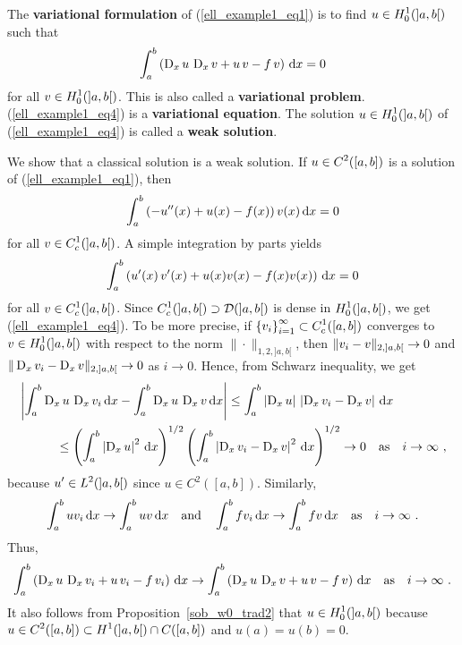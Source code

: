 \begin{egg}
The {\bfseries variational formulation} of
(\ref{ell_example1_eq1}) is to find $\displaystyle u \in H^1_0(]a,b[)$ such that
\begin{equation} \label{ell_example1_eq4}
\int_a^b \left( \operatorname{D}_x u\,\operatorname{D}_x v + u\, v -f\, v \right) \,\mathrm{d}{x} = 0
\end{equation}
for all $\displaystyle v \in H^{1}_0(]a,b[)$.
This is also called a {\bfseries variational problem}.
(\ref{ell_example1_eq4}) is a {\bfseries variational equation}.  The
solution $\displaystyle u \in H^1_0(]a,b[)$ of
(\ref{ell_example1_eq4}) is called a {\bfseries weak solution}.

We show that a classical solution is a weak solution.  If
$\displaystyle u \in C^2([a,b])$ is a solution of (\ref{ell_example1_eq1}), then
\[
\int_a^b \left( - u''(x) + u(x) - f(x) \right)v(x)\,\mathrm{d}{x} = 0
\]
for all $\displaystyle v \in C^1_c(]a,b[)$.
A simple integration by parts yields
\[
\int_a^b \left( u'(x)\, v'(x)+ u(x) v(x) -
f(x)v(x)\right) \,\mathrm{d}{x} = 0
\]
for all $\displaystyle v \in C^1_c(]a,b[)$.
Since $\displaystyle C^1_c(]a,b[)\supset \mathcal{D}(]a,b[)$ is dense in
$\displaystyle H^1_0(]a,b[)$, we get (\ref{ell_example1_eq4}).  To be
more precise, if
$\displaystyle \left\{v_i\right\}_{i=1}^\infty \subset C^1_c([a,b])$
converges to $\displaystyle v \in H^1_0(]a,b[)$ with respect to the norm
$\|\cdot\|_{1,2,]a,b[}$, then
$\displaystyle \|v_i - v\|_{2,]a,b[} \to 0$ and
$\displaystyle \|\operatorname{D}_x v_i - \operatorname{D}_x v\|_{2,]a,b[} \to 0$ as $i \to 0$.
Hence, from Schwarz inequality, we get
\begin{align*}
&\left|\int_a^b \operatorname{D}_x u \, \operatorname{D}_x v_i \,\mathrm{d}{x} - 
\int_a^b \operatorname{D}_x u\, \operatorname{D}_x v \,\mathrm{d}{x} \right|
\leq \int_a^b \left|\operatorname{D}_x u\right| \,
\left| \operatorname{D}_x v_i -\operatorname{D}_x v\right| \,\mathrm{d}{x} \\
&\qquad \quad \leq \left(\int_a^b \left|\operatorname{D}_x u\right|^2 \,\mathrm{d}{x} \right)^{1/2}
\left( \int_a^b \left| \operatorname{D}_x v_i -\operatorname{D}_x v\right|^2 \,\mathrm{d}{x} \right)^{1/2}
\to 0 \quad \text{as} \quad i \to \infty \ ,
\end{align*}
because $\displaystyle u' \in L^2(]a,b[)$ since $u\in C^2([a,b])$.  Similarly,
\[
\int_a^b u v_i \,\mathrm{d}{x} \to \int_a^b u v \,\mathrm{d}{x} \quad \text{and} \quad
\int_a^b f v_i \,\mathrm{d}{x} \to \int_a^b f v \,\mathrm{d}{x} \quad \text{as} \quad
i \to \infty \ .
\]
Thus,
\[
\int_a^b \left( \operatorname{D}_x u\, \operatorname{D}_x v_i + u\, v_i  - f\, v_i\right) \,\mathrm{d}{x} \to
\int_a^b \left( \operatorname{D}_x u \, \operatorname{D}_x v + u\, v - f\, v \right) \,\mathrm{d}{x}
\quad \text{as} \quad i \to \infty \ .
\]
It also follows from Proposition~\ref{sob_w0_trad2} that
$\displaystyle u \in H^1_0(]a,b[)$ because \\
$\displaystyle u \in C^2([a,b]) \subset H^1(]a,b[) \cap C([a,b])$ and
$u(a)=u(b)=0$.


\end{egg}
